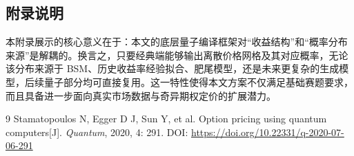 \documentclass[12pt,a4paper]{ctexart}
\begin{document}
\subsection{附录说明}
本附录展示的核心意义在于：本文的底层量子编译框架对“收益结构”和“概率分布来源”是解耦的。换言之，只要经典端能够输出离散价格网格及其对应概率，无论该分布来源于 BSM、历史收益率经验拟合、肥尾模型，还是未来更复杂的生成模型，后续量子部分均可直接复用。这一特性使得本文方案不仅满足基础赛题要求，而且具备进一步面向真实市场数据与奇异期权定价的扩展潜力。

\begin{thebibliography}{9}
Stamatopoulos N, Egger D J, Sun Y, et al.
\newblock Option pricing using quantum computers[J].
\newblock \emph{Quantum}, 2020, 4: 291.
\newblock DOI: \url{https://doi.org/10.22331/q-2020-07-06-291}
\end{thebibliography}
\end{document}
